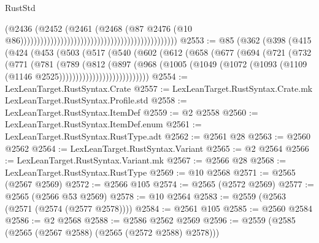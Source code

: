 \begin{lexlean}{RustStd}
\begin{coremodule}
                                                                                      (@2436
                                                                                        (@2452
                                                                                          (@2461
                                                                                            (@2468
                                                                                              (@87
                                                                                                @2476
                                                                                                (@10
                                                                                                  @86)))))))))))))))))))))))))))))))))))))))))))))))
@2553 := @85
    (@362
      (@398
        (@415
          (@424
            (@453
              (@503
                (@517
                  (@540
                    (@602
                      (@612
                        (@658
                          (@677
                            (@694
                              (@721
                                (@732
                                  (@771
                                    (@781
                                      (@789
                                        (@812
                                          (@897
                                            (@968
                                              (@1005
                                                (@1049
                                                  (@1072
                                                    (@1093
                                                      (@1109 (@1146 @2525)))))))))))))))))))))))))))
@2554 := LexLeanTarget.RustSyntax.Crate
@2557 := LexLeanTarget.RustSyntax.Crate.mk LexLeanTarget.RustSyntax.Profile.std
@2558 := LexLeanTarget.RustSyntax.ItemDef
@2559 := @2 @2558
@2560 := LexLeanTarget.RustSyntax.ItemDef.enum
@2561 := LexLeanTarget.RustSyntax.RustType.adt
@2562 := @2561 @28
@2563 := @2560 @2562
@2564 := LexLeanTarget.RustSyntax.Variant
@2565 := @2 @2564
@2566 := LexLeanTarget.RustSyntax.Variant.mk
@2567 := @2566 @28
@2568 := LexLeanTarget.RustSyntax.RustType
@2569 := @10 @2568
@2571 := @2565 (@2567 @2569)
@2572 := @2566 @105
@2574 := @2565 (@2572 @2569)
@2577 := @2565 (@2566 @53 @2569)
@2578 := @10 @2564
@2583 := @2559 (@2563 (@2571 (@2574 (@2577 @2578))))
@2584 := @2561 @105
@2585 := @2560 @2584
@2586 := @2 @2568
@2588 := @2586 @2562 @2569
@2596 := @2559 (@2585 (@2565 (@2567 @2588) (@2565 (@2572 @2588) @2578)))

\end{coremodule}
\end{lexlean}
